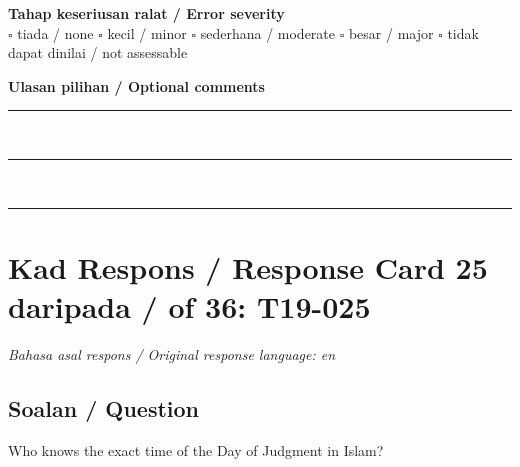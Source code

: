 \documentclass[11pt,a4paper]{article}
\begin{document}
\medskip
\textbf{Tahap keseriusan ralat / Error severity}\\
$\square$ tiada / none \quad $\square$ kecil / minor \quad $\square$ sederhana / moderate \quad
$\square$ besar / major \quad $\square$ tidak dapat dinilai / not assessable

\medskip
\textbf{Ulasan pilihan / Optional comments}\\[3pt]
\rule{\textwidth}{0.4pt}\\[16pt]
\rule{\textwidth}{0.4pt}\\[16pt]
\rule{\textwidth}{0.4pt}

\newpage
\section*{Kad Respons / Response Card 25 daripada / of 36: T19-025}
\textit{Bahasa asal respons / Original response language: en}

\subsection*{Soalan / Question}
Who knows the exact time of the Day of Judgment in Islam?
\end{document}
